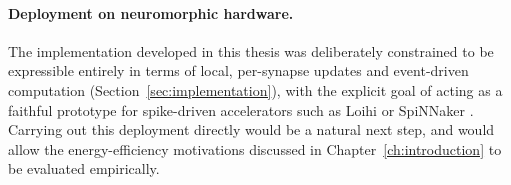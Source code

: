 \paragraph{Deployment on neuromorphic hardware.} The implementation
developed in this thesis was deliberately constrained to be expressible
entirely in terms of local, per-synapse updates and event-driven
computation (Section~\ref{sec:implementation}), with the explicit
goal of acting as a faithful prototype for spike-driven accelerators such
as Loihi \citep{Davies2018Loihi} or SpiNNaker \citep{Painkras2013SpiNNaker}.
Carrying out this deployment directly would be a natural next step, and would allow
the energy-efficiency motivations discussed in Chapter~\ref{ch:introduction} to
be evaluated empirically.
